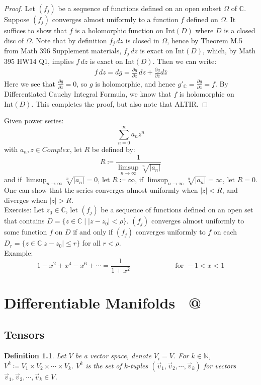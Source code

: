 \documentclass[15pt]{book}
\makeatletter
\theoremstyle{break}
\theoremstyle{break}
\newtheorem{defn}{Definition}[corL]
\newcommand{\N}{\mathbb{N}}
\newcommand{\Int}{\text{Int}}
\newcommand{\Complex}{\mathbb{C}}
\newcommand{\example}{\color{green}Example: \color{black}}
\newcommand{\exercise}{\color{green}Exercise: \color{black}}
\newcommand*{\rom}[1]{\expandafter\@slowromancap\romannumeral #1@}
\makeatother
\begin{document}
\begin{proof}
Let $(f_j)$ be a sequence of functions defined on an open subset $\Omega$ of $\Complex$. Suppose $(f_j)$ converges almost uniformly to a function $f $ defined on $\Omega$.  It suffices to show that $f$ is a holomorphic function on $\Int(D)$ where $D$ is a closed disc of $\Omega$. Note that by definition $f_j \, dz$ is closed in $\Omega$, hence by Theorem M.5 from Math 396 Supplement materials, $f_j \, dz$ is exact on $\Int(D)$, which, by Math 395 HW14 Q1, implies $f\, dz$ is exact on $\Int(D)$. Then we can write:
\begin{align*}
 f \, dz = dg = \frac{\partial g}{\partial z}\, dz + \frac{\partial g}{\partial \bar{z}}d\bar{z}
\end{align*}
Here we see that $\frac{\partial g}{\partial \bar{z}} = 0$, so $g$ is holomorphic, and hence $g'_{\Complex} = \frac{\partial g}{\partial z} = f$. By Differentiated Cauchy Integral Formula, we know that $f$ is holomorphic on $\Int(D)$. This completes the proof, but also note that ALTIR.
\end{proof}

Given power series: 
$$\sum_{n=0}^\infty a_n z^n$$
with $a_n, z \in Complex$, let $R$ be defined by:
$$R \coloneqq \frac{1}{\limsup_{n\to \infty} \sqrt[n]{|a_n|}} $$ and if $\limsup_{n\to \infty} \sqrt[n]{|a_n|}=0$, let $R \coloneqq \infty$, if $\limsup_{n\to \infty} \sqrt[n]{|a_n|} = \infty$, let $R = 0$. One can show that the series converges almost uniformly when $|z|<R$, and diverges when $|z|>R$.  \\

\exercise Let $z_0 \in \Complex$, let $(f_j)$ be a sequence of functions defined on an open set that contains $D = \{z \in \Complex \mid |z-z_0| < \rho\}$. $(f_j)$ converges almost uniformly to some function $f$ on $D$ if and only if $(f_j)$ converges uniformly to $f$ on each $D_r = \{ z \in \Complex |z-z_0|\leq r\}$ for all $r<\rho$. \\


\example
$$1-x^2 + x^4 -x^6+\cdots = \frac{1}{1+x^2} \qquad\qquad\qquad\text{ for }-1<x<1$$


\chapter{Differentiable Manifolds \ \rom{2}}
\setcounter{section}{24}
\section[Tensors]{\color{red}Tensors\color{black}}
\begin{defn}
Let $V$ be a vector space, denote $V_i = V$. For $k \in \N$, $V^k \coloneqq V_1 \times V_2 \times \cdots \times V_k$. $V^k$ is the set of $k$-tuples $(\vec{v}_1,\vec{v}_2,\cdots, \vec{v}_k)$ for vectors $\vec{v}_1,\vec{v}_2,\cdots, \vec{v}_k \in V$. 
\end{defn}
\end{document}

